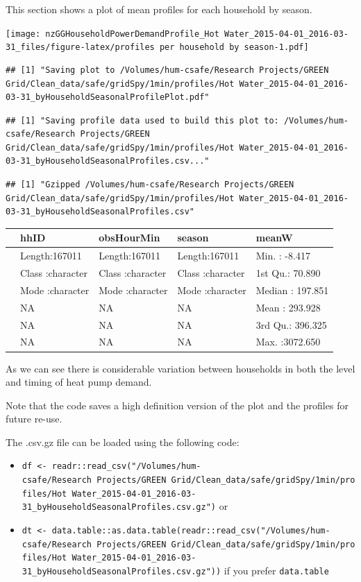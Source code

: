 \documentclass[]{article}
\providecommand{\tightlist}{%
  \setlength{\itemsep}{0pt}\setlength{\parskip}{0pt}}
\begin{document}
This section shows a plot of mean profiles for each household by season.

\texttt{[image: nzGGHouseholdPowerDemandProfile\_Hot Water\_2015-04-01\_2016-03-31\_files/figure-latex/profiles per household by season-1.pdf]}

\begin{verbatim}
## [1] "Saving plot to /Volumes/hum-csafe/Research Projects/GREEN Grid/Clean_data/safe/gridSpy/1min/profiles/Hot Water_2015-04-01_2016-03-31_byHouseholdSeasonalProfilePlot.pdf"
\end{verbatim}

\begin{verbatim}
## [1] "Saving profile data used to build this plot to: /Volumes/hum-csafe/Research Projects/GREEN Grid/Clean_data/safe/gridSpy/1min/profiles/Hot Water_2015-04-01_2016-03-31_byHouseholdSeasonalProfiles.csv..."
\end{verbatim}

\begin{verbatim}
## [1] "Gzipped /Volumes/hum-csafe/Research Projects/GREEN Grid/Clean_data/safe/gridSpy/1min/profiles/Hot Water_2015-04-01_2016-03-31_byHouseholdSeasonalProfiles.csv"
\end{verbatim}

\begin{longtable}[]{@{}lllll@{}}
\toprule
& hhID & obsHourMin & season & meanW\tabularnewline
\midrule
\endhead
& Length:167011 & Length:167011 & Length:167011 & Min. :
-8.417\tabularnewline
& Class :character & Class :character & Class :character & 1st Qu.:
70.890\tabularnewline
& Mode :character & Mode :character & Mode :character & Median :
197.851\tabularnewline
& NA & NA & NA & Mean : 293.928\tabularnewline
& NA & NA & NA & 3rd Qu.: 396.325\tabularnewline
& NA & NA & NA & Max. :3072.650\tabularnewline
\bottomrule
\end{longtable}

As we can see there is considerable variation between households in both
the level and timing of heat pump demand.

Note that the code saves a high definition version of the plot and the
profiles for future re-use.

The .csv.gz file can be loaded using the following code:

\begin{itemize}
\tightlist
\item
  \texttt{df\ \textless{}-\ readr::read\_csv("/Volumes/hum-csafe/Research\ Projects/GREEN\ Grid/Clean\_data/safe/gridSpy/1min/profiles/Hot\ Water\_2015-04-01\_2016-03-31\_byHouseholdSeasonalProfiles.csv.gz")}
  or
\item
  \texttt{dt\ \textless{}-\ data.table::as.data.table(readr::read\_csv("/Volumes/hum-csafe/Research\ Projects/GREEN\ Grid/Clean\_data/safe/gridSpy/1min/profiles/Hot\ Water\_2015-04-01\_2016-03-31\_byHouseholdSeasonalProfiles.csv.gz"))}
  if you prefer \texttt{data.table}
\end{itemize}
\end{document}
